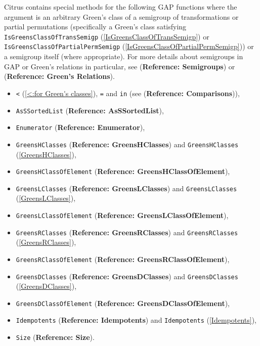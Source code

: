 \documentclass[a4paper,11pt]{report}
\begin{document}
{{ \textsf{Citrus} contains special methods for the following \textsf{GAP} functions where the argument is an arbitrary Green's class of a semigroup of
transformations or partial permutations (specifically a Green's class
satisfying \texttt{IsGreensClassOfTransSemigp} (\ref{IsGreensClassOfTransSemigp}) or \texttt{IsGreensClassOfPartialPermSemigp} (\ref{IsGreensClassOfPartialPermSemigp})) or a semigroup itself (where appropriate). For more details about semigroups
in \textsf{GAP} or Green's relations in particular, see  (\textbf{Reference: Semigroups}) or  (\textbf{Reference: Green's Relations}). 
\begin{itemize}
\item  \texttt{\texttt{}{\textless}} (\ref{<:for Green's classes}), \texttt{=} and \texttt{in} (see  (\textbf{Reference: Comparisons})), 
\item  \texttt{AsSSortedList} (\textbf{Reference: AsSSortedList}), 
\item  \texttt{Enumerator} (\textbf{Reference: Enumerator}), 
\item  \texttt{GreensHClasses} (\textbf{Reference: GreensHClasses}) and \texttt{GreensHClasses} (\ref{GreensHClasses}), 
\item  \texttt{GreensHClassOfElement} (\textbf{Reference: GreensHClassOfElement}), 
\item  \texttt{GreensLClasses} (\textbf{Reference: GreensLClasses}) and \texttt{GreensLClasses} (\ref{GreensLClasses}), 
\item  \texttt{GreensLClassOfElement} (\textbf{Reference: GreensLClassOfElement}), 
\item  \texttt{GreensRClasses} (\textbf{Reference: GreensRClasses}) and \texttt{GreensRClasses} (\ref{GreensRClasses}), 
\item  \texttt{GreensRClassOfElement} (\textbf{Reference: GreensRClassOfElement}), 
\item  \texttt{GreensDClasses} (\textbf{Reference: GreensDClasses}) and \texttt{GreensDClasses} (\ref{GreensDClasses}), 
\item  \texttt{GreensDClassOfElement} (\textbf{Reference: GreensDClassOfElement}), 
\item  \texttt{Idempotents} (\textbf{Reference: Idempotents}) and \texttt{Idempotents} (\ref{Idempotents}), 
\item  \texttt{Size} (\textbf{Reference: Size}). 
\end{itemize}
 

}}
\end{document}
